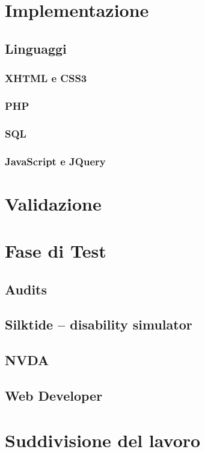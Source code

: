 \documentclass[a4paper, oneside, openany, dvipsnames, table]{article}
\begin{document}
\section{Implementazione}
	
	\subsection{Linguaggi}
		
		\subsubsection{XHTML e CSS3}
			
		\subsubsection{PHP}
			
		\subsubsection{SQL}
			
		\subsubsection{JavaScript e JQuery}
\newpage
\section{Validazione}
	
\newpage
\section{Fase di Test}
	
	\subsection{Audits}
			
	\subsection{Silktide – disability simulator}
			
	\subsection{NVDA}
			
	\subsection{Web Developer}
				
\newpage
\section{Suddivisione del lavoro}
	
						
\end{document}

